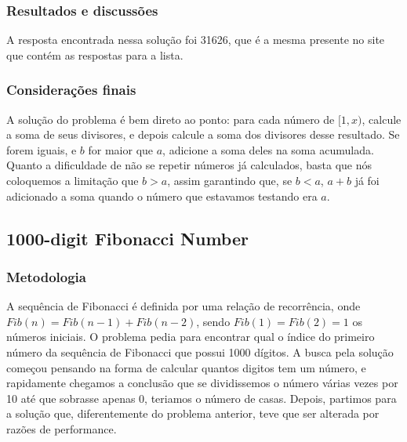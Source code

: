 \documentclass{article}
\begin{document}
        \subsubsection{Resultados e discussões}
        A resposta encontrada nessa solução foi 31626, que é a mesma presente no site que contém as respostas para a lista.
        
        \subsubsection{Considerações finais}
        A solução do problema é bem direto ao ponto: para cada número de $[1, x)$, calcule a soma de seus divisores, e depois calcule a soma dos divisores desse resultado. Se forem iguais, e $b$ for maior que $a$, adicione a soma deles na soma acumulada.
        Quanto a dificuldade de não se repetir números já calculados, basta que nós coloquemos a limitação que $b > a$, assim garantindo que, se $b < a$, $a + b$ já foi adicionado a soma quando o número que estavamos testando era $a$.

    \subsection{1000-digit Fibonacci Number}
        
        \subsubsection{Metodologia}
        A sequência de Fibonacci é definida por uma relação de recorrência, onde $Fib(n) = Fib(n - 1) + Fib(n - 2)$, sendo $Fib(1) = Fib(2) = 1$ os números iniciais.
        O problema pedia para encontrar qual o índice do primeiro número da sequência de Fibonacci que possui 1000 dígitos.
        A busca pela solução começou pensando na forma de calcular quantos digitos tem um número, e rapidamente chegamos a conclusão que se dividissemos o número várias vezes por 10 até que sobrasse apenas 0, teriamos o número de casas. Depois, partimos para a solução que, diferentemente do problema anterior, teve que ser alterada por razões de performance.
        
\end{document}
